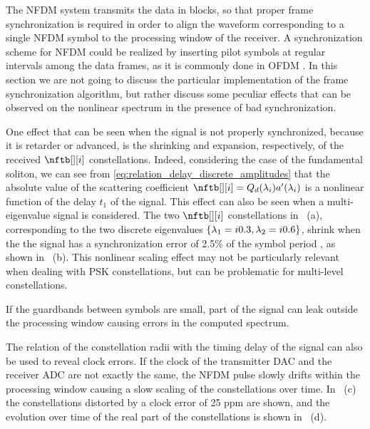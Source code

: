 The \ac{NFDM} system transmits the data in blocks, so that proper frame synchronization is required in order to align the waveform corresponding to a single \ac{NFDM} symbol to the processing window of the receiver. A synchronization scheme for \ac{NFDM} could be realized  by inserting pilot symbols at regular intervals among the data frames, as it is commonly done in \ac{OFDM} \cite{qian2011101}.
In this section we are not going to discuss the particular implementation of the frame synchronization algorithm, but rather discuss some peculiar effects that can be observed on the nonlinear spectrum in the presence of bad synchronization.

One effect that can be seen when the signal is not properly synchronized,
because it is retarder or advanced, is the shrinking and expansion, respectively, of the
received $\nftb[][i]$ constellations. Indeed, considering the case of the
fundamental soliton, we can see from
\eqref{eq:relation_delay_discrete_amplitudes} that the absolute value of the
scattering coefficient $\nftb[][i] = \dnft[i] \nftaderiv[i]$ is a nonlinear function of the delay $t_1$ of the signal.
This effect can also be seen when a multi-eigenvalue
signal is considered. The two $\nftb[][i]$  constellations in ~(a), corresponding to the two discrete eigenvalues $\{\eig[1]=\iunit0.3, \eig[2]=\iunit0.6\}$, shrink when the the signal has a synchronization error of 2.5\% of the symbol period \Ts{}, as shown in ~(b). This nonlinear scaling
effect may not be particularly relevant when dealing with \ac{PSK} constellations, but
can be problematic for multi-level constellations.

\begin{extendedthesis}
If the guardbands between symbols are small, part of the signal can leak outside the processing window causing errors in the computed spectrum.
\end{extendedthesis}

The relation of the constellation radii with the timing delay of the signal can also be used to reveal clock errors. If the clock of the transmitter \ac{DAC} and the receiver \ac{ADC} are not exactly the same, the \ac{NFDM} pulse slowly drifts within the processing window causing a slow scaling of the constellations over time. In ~(c) the constellations distorted by a clock error of \si{25} \ac{ppm} are shown, and the evolution over time of the real part of the constellations is shown in ~(d).

